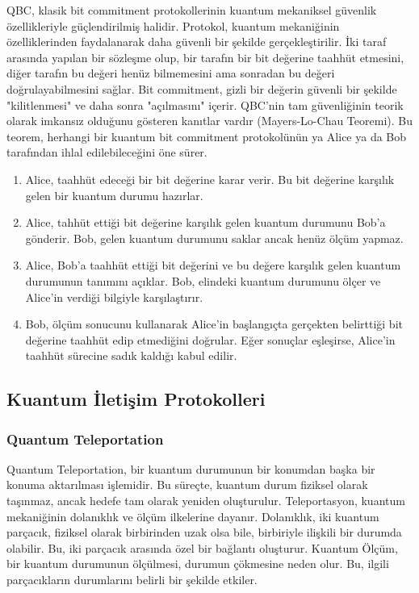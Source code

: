 QBC, klasik bit commitment protokollerinin kuantum mekaniksel güvenlik özellikleriyle güçlendirilmiş halidir. Protokol, kuantum mekaniğinin özelliklerinden faydalanarak daha güvenli bir şekilde gerçekleştirilir. İki taraf arasında yapılan bir sözleşme olup, bir tarafın bir bit değerine taahhüt etmesini, diğer tarafın bu değeri henüz bilmemesini ama sonradan bu değeri doğrulayabilmesini sağlar. Bit commitment, gizli bir değerin güvenli bir şekilde "kilitlenmesi" ve daha sonra "açılmasını" içerir. QBC'nin tam güvenliğinin teorik olarak imkansız olduğunu gösteren kanıtlar vardır (Mayers-Lo-Chau Teoremi). Bu teorem, herhangi bir kuantum bit commitment protokolünün ya Alice ya da Bob tarafından ihlal edilebileceğini öne sürer.

\begin{enumerate}
    \item Alice, taahhüt edeceği bir bit değerine karar verir. Bu bit değerine karşılık gelen bir kuantum durumu hazırlar.
    \item Alice, tahhüt ettiği bit değerine karşılık gelen kuantum durumunu Bob'a gönderir. Bob, gelen kuantum durumunu saklar ancak henüz ölçüm yapmaz.
    \item Alice, Bob'a taahhüt ettiği bit değerini ve bu değere karşılık gelen kuantum durumunun tanımını açıklar. Bob, elindeki kuantum durumunu ölçer ve Alice'in verdiği bilgiyle karşılaştırır.
    \item Bob, ölçüm sonucunu kullanarak Alice'in başlangıçta gerçekten belirttiği bit değerine taahhüt edip etmediğini doğrular. Eğer sonuçlar eşleşirse, Alice'in taahhüt sürecine sadık kaldığı kabul edilir.
\end{enumerate}

\newpage

\subsection{Kuantum İletişim Protokolleri}

\subsubsection{Quantum Teleportation}

Quantum Teleportation, bir kuantum durumunun bir konumdan başka bir konuma aktarılması işlemidir. Bu süreçte, kuantum durum fiziksel olarak taşınmaz, ancak hedefe tam olarak yeniden oluşturulur. Teleportasyon, kuantum mekaniğinin dolanıklık ve ölçüm ilkelerine dayanır. Dolanıklık, iki kuantum parçacık, fiziksel olarak birbirinden uzak olsa bile, birbiriyle ilişkili bir durumda olabilir. Bu, iki parçacık arasında özel bir bağlantı oluşturur. Kuantum Ölçüm, bir kuantum durumunun ölçülmesi, durumun çökmesine neden olur. Bu, ilgili parçacıkların durumlarını belirli bir şekilde etkiler.

